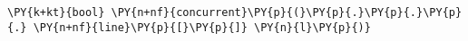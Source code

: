 \begin{Verbatim}[commandchars=\\\{\}]
    \PY{k+kt}{bool} \PY{n+nf}{concurrent}\PY{p}{(}\PY{p}{.}\PY{p}{.}\PY{p}{.} \PY{n+nf}{line}\PY{p}{[}\PY{p}{]} \PY{n}{l}\PY{p}{)}
\end{Verbatim}
